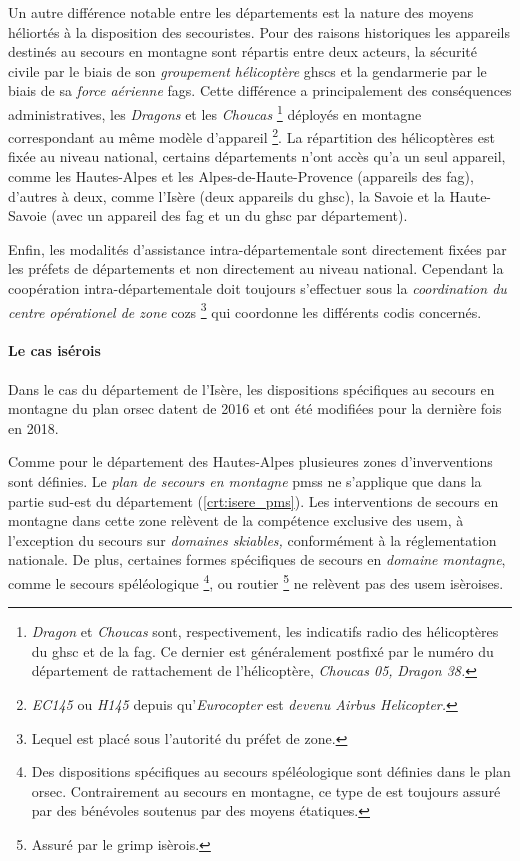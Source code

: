 Un autre différence notable entre les départements est la nature des
moyens héliortés à la disposition des secouristes. Pour des raisons
historiques les appareils destinés au secours en montagne sont
répartis entre deux acteurs, la sécurité civile par le biais de son
\emph{groupement hélicoptère} \acp{ghsc} et la gendarmerie par le
biais de sa \emph{force aérienne} \acp{fag}. Cette différence a
principalement des conséquences administratives, les \emph{Dragons} et
les \emph{Choucas} \footnote{\emph{Dragon} et \emph{Choucas} sont,
  respectivement, les indicatifs radio des hélicoptères du \ac{ghsc}
  et de la \ac{fag}. Ce dernier est généralement postfixé par le
  numéro du département de rattachement de l'hélicoptère, \eg
  \emph{Choucas 05,} \emph{Dragon 38.}} déployés en montagne
correspondant au même modèle d'appareil \footnote{\emph{EC145} ou
  \emph{H145} depuis qu'\emph{Eurocopter} est \emph{devenu Airbus
    Helicopter.}}. La répartition des hélicoptères est fixée au niveau
national, certains départements n'ont accès qu'a un seul appareil,
comme les Hautes-Alpes et les Alpes-de-Haute-Provence (appareils des
\ac{fag}), d'autres à deux, comme l'Isère (deux appareils du
\ac{ghsc}), la Savoie et la Haute-Savoie (avec un appareil des
\ac{fag} et un du \ac{ghsc} par département).

Enfin, les modalités d'assistance intra-départementale sont
directement fixées par les préfets de départements et non directement
au niveau national. Cependant la coopération intra-départementale doit
toujours s'effectuer sous la\emph{ coordination du centre opérationel
  de zone} \acp{coz} \footnote{Lequel est placé sous l'autorité du
  préfet de zone.} qui coordonne les différents \ac{codis} concernés.

\paragraph{Le cas isérois}

Dans le cas du département de l'Isère, les dispositions spécifiques au
secours en montagne du plan \ac{orsec} datent de 2016 et ont été
modifiées pour la dernière fois en 2018.

Comme pour le département des Hautes-Alpes plusieures zones
d'inverventions sont définies. Le \emph{plan de secours en montagne}
\acp{pms} ne s'applique que dans la partie sud-est du département
(\autoref{crt:isere_pms}). Les interventions de secours en montagne
dans cette zone relèvent de la compétence exclusive des \ac{usem}, à
l'exception du secours sur \emph{domaines skiables,} conformément à la
réglementation nationale. De plus, certaines formes spécifiques de
secours en \emph{domaine montagne}, comme le secours spéléologique
\footnote{Des dispositions spécifiques au secours spéléologique sont
  définies dans le plan \ac{orsec}. Contrairement au secours en
  montagne, ce type de est toujours assuré par des bénévoles soutenus
  par des moyens étatiques.}, ou routier \footnote{Assuré par le
  \ac{grimp} isèrois.}  ne relèvent pas des \ac{usem} isèroises.

